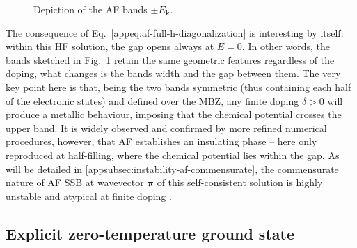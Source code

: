 \begin{figure}
	\centering
	\caption{Depiction of the AF bands $\pm E_\mathbf{k}$. \todo}
	\label{appfig:antiferromagnetic-3d-bands}
\end{figure}

The consequence of Eq.~\eqref{appeq:af-full-h-diagonalization} is interesting by itself: within this HF solution, the gap opens always at $E=0$. In other words, the bands sketched in Fig.~\ref{appfig:antiferromagnetic-3d-bands} retain the same geometric features regardless of the doping, what changes is the bands width and the gap between them. The very key point here is that, being the two bands symmetric (thus containing each half of the electronic states) and defined over the MBZ, any finite doping $\delta>0$ will produce a metallic behaviour, imposing that the chemical potential crosses the upper band. It is widely observed and confirmed by more refined numerical procedures, however, that AF establishes an insulating phase -- here only reproduced at half-filling, where the chemical potential lies within the gap. As will be detailed in \ref{appsubsec:instability-af-commensurate}, the commensurate nature of AF SSB at wavevector $\bm{\pi}$ of this self-consistent solution is highly unstable and atypical at finite doping \cite{singh1990collective}.

\subsection{Explicit zero-temperature ground state}

